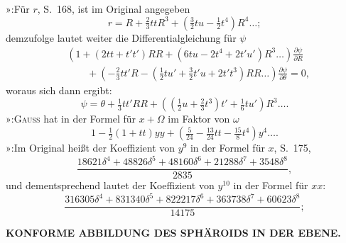 {\noindent »\quad [17]:\quad Für \(r\), S.\ 168, ist im Original angegeben
\[
r=R+\tfrac23ttR^3+(\tfrac32tu-\tfrac12t^4)R^4\ldots;
\]
\noindent demzufolge lautet weiter die Differentialgleichung für \(\psi\)
\[
\begin{aligned}
&\left(1+(2tt+t't')RR+(6tu-2t^4+2t'u')R^3\ldots\right)
 \frac{\partial\psi}{\partial R}\\
&\qquad+\left(-\tfrac23tt'R-(\tfrac12tu'+\tfrac32t'u+2t't^3)RR\ldots\right)
 \frac{\partial\psi}{\partial\theta}=0,
\end{aligned}
\]
\noindent woraus sich dann ergibt:
\[
\psi=\theta+\tfrac13tt'RR+\left((\tfrac12u+\tfrac23t^3)t'+\tfrac16tu'\right)R^3\ldots.
\]
\noindent »\quad [20]:\quad \textsc{Gauss} hat in der Formel für \(x+\Omega\) im Faktor von \(\omega\)
\[
1-\tfrac12(1+tt)yy+(\tfrac5{24}-\tfrac{13}{24}tt-\tfrac{15}8t^4)y^4\ldots.
\]
\noindent »\quad [23]:\quad Im Original heißt der Koeffizient von \(y^9\) in der Formel für \(x\), S.\ 175,
\[
\frac{18621\delta^4+48826\delta^5+48160\delta^6+21288\delta^7+3548\delta^8}{2835},
\]
\noindent und dementsprechend lautet der Koeffizient von \(y^{10}\) in der Formel für \(xx\):
\[
\frac{316305\delta^4+831340\delta^5+822217\delta^6+363738\delta^7+60623\delta^8}{14175};
\]
\par}

\par\clearpage
\noindent\null\hfill{\small\textbf{KONFORME ABBILDUNG DES SPHÄROIDS IN DER EBENE.}}\hfill{}\par\medskip


